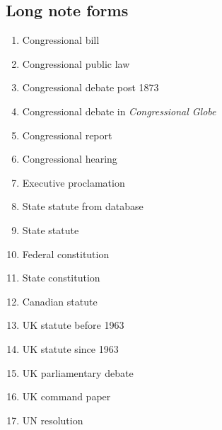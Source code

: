 \documentclass[a4paper,12pt]{article}
\begin{document}
\subsection*{Long note forms}
\label{legis:long}
\begin{enumerate}\setlength{\parskip}{-4pt}
\setcounter{enumi}{15}
\item Congressional bill\autocite{congress:bill}
\item Congressional public law\autocite{congress:publiclaw}
\item Congressional debate post 1873\autocite{congress:debate:new}
\item Congressional debate in \emph{Congressional
    Globe}\autocite{congress:debate:globe}
\item Congressional report\autocite{congress:report}
\item Congressional hearing\autocite{congress:hearing}
\item Executive proclamation\autocite{executive:proclamation}
\item State statute from database\autocite{state:statute:ky}
\item State statute\autocite{state:statute:okla}
\item Federal constitution\autocite{constitution:federal}
\item State constitution\autocite{constitution:arkansas}
\item Canadian statute\autocite{canada:statute}
\item UK statute before 1963\autocite{uk:statute:regnal}
\item UK statute since 1963\autocite{uk:statute}
\item UK parliamentary debate\autocite{uk:hansard}
\item UK command paper\autocite{uk:command}
\item UN resolution\autocite{un:resolution}
\end{enumerate}
\end{document}
